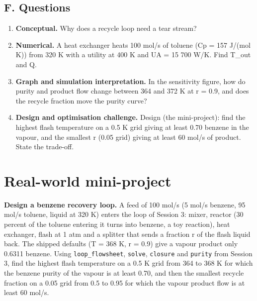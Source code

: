 \documentclass[11pt,a4paper]{article}
\begin{document}
\subsection*{F. Questions}
\begin{enumerate}[nosep]
\item \textbf{Conceptual.} Why does a recycle loop need a tear stream?
\item \textbf{Numerical.} A heat exchanger heats 100 mol/s of toluene (Cp = 157 J/(mol K)) from 320 K with a utility at 400 K and UA = 15 700 W/K. Find T\_out and Q.
\item \textbf{Graph and simulation interpretation.} In the sensitivity figure, how do purity and product flow change between 364 and 372 K at r = 0.9, and does the recycle fraction move the purity curve?
\item \textbf{Design and optimisation challenge.} Design (the mini-project): find the highest flash temperature on a 0.5 K grid giving at least 0.70 benzene in the vapour, and the smallest r (0.05 grid) giving at least 60 mol/s of product. State the trade-off.
\end{enumerate}

\section{Real-world mini-project}
\textbf{Design a benzene recovery loop.} A feed of 100 mol/s (5 mol/s benzene, 95 mol/s toluene, liquid at 320 K) enters the loop of Session 3: mixer, reactor (30 percent of the toluene entering it turns into benzene, a toy reaction), heat exchanger, flash at 1 atm and a splitter that sends a fraction r of the flash liquid back. The shipped defaults (T = 368 K, r = 0.9) give a vapour product only 0.6311 benzene. Using \texttt{loop\_flowsheet}, \texttt{solve}, \texttt{closure} and \texttt{purity} from Session 3, find the highest flash temperature on a 0.5 K grid from 364 to 368 K for which the benzene purity of the vapour is at least 0.70, and then the smallest recycle fraction on a 0.05 grid from 0.5 to 0.95 for which the vapour product flow is at least 60 mol/s.
\end{document}
